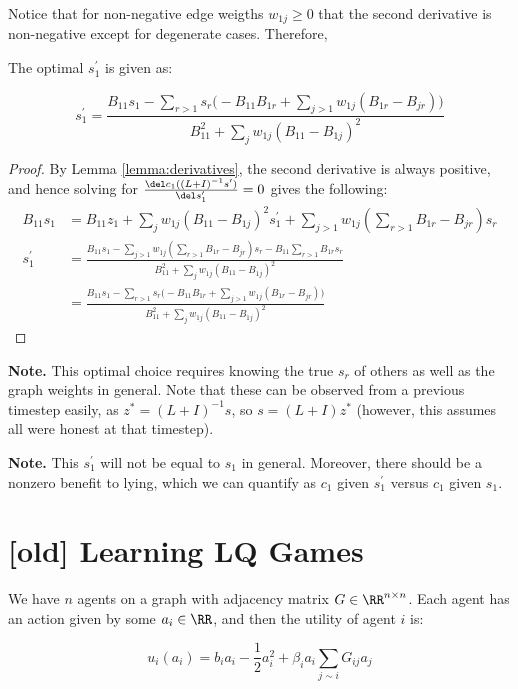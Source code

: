 Notice that for non-negative edge weigths $w_{1j} \geq 0$ that the second derivative is non-negative except for degenerate cases. Therefore, 


\begin{prop}
The optimal $s_1^\prime$ is given as: 

\[
s_1^\prime = \frac{B_{11} s_1 - 
\sum_{r > 1} s_r \big(
- B_{11} B_{1r}
+ \sum_{j > 1} w_{1j} (B_{1r} - B_{jr})
\big)
}{B_{11}^2 + \sum_j w_{1j} (B_{11} - B_{1j})^2}  
\]
\end{prop}


\begin{proof}
By Lemma \ref{lemma:derivatives}, the second derivative is always positive, and hence solving for $\frac{\del c_1((L + I)^{-1} s^\prime)}{\del s_1^\prime} = 0$ gives the following: 
\begin{align*}
B_{11} s_1 &= B_{11} z_1 + \sum_j w_{1j} (B_{11} - B_{1j})^2 s_1^\prime 
+ \sum_{j > 1} w_{1j} (\sum_{r > 1} B_{1r} - B_{jr}) s_r \\
s_1^\prime &= \frac{B_{11} s_1 - \sum_{j > 1}  w_{1j} (\sum_{r > 1} B_{1r} - B_{jr}) s_r 
- B_{11} \sum_{r > 1} B_{1r} s_r
}{B_{11}^2 + \sum_j w_{1j} (B_{11} - B_{1j})^2}   \\
&= \frac{B_{11} s_1 - 
\sum_{r > 1} s_r \big(
- B_{11} B_{1r}
+ \sum_{j > 1} w_{1j} (B_{1r} - B_{jr})
\big)
}{B_{11}^2 + \sum_j w_{1j} (B_{11} - B_{1j})^2}  
\end{align*}
\end{proof}

{\bf Note.} This optimal choice requires knowing the true $s_r$ of others as well as the graph weights in general. Note that these can be observed from a previous timestep easily, as $z^* = (L + I)^{-1} s$, so $s = (L + I) z^*$ (however, this assumes all were honest at that timestep).

{\bf Note.} This $s_1^\prime$ will not be equal to $s_{1}$ in general. Moreover, there should be a nonzero benefit to lying, which we can quantify as $c_{1}$ given $s_1^\prime$ versus $c_1$ given $s_1$. 

\section{[old] Learning LQ Games}

We have $n$ agents on a graph with adjacency matrix $G \in \RR^{n \times n}$. Each agent has an action given by some $a_i \in \RR$, and then the utility of agent $i$ is:

\[
u_i(a_i) = b_i a_i - \frac 1 2 a_i^2 + \beta_i a_i \sum_{j \sim i} G_{ij} a_j
\]

